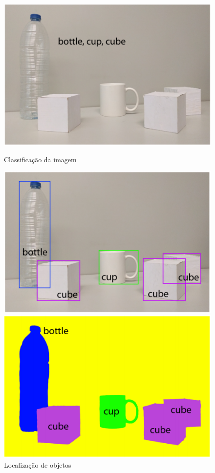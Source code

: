 \documentclass[12pt]{report}
\begin{document}
\begin{figure}
  \centering
  \begin{minipage}[b]{0.4\textwidth}
    \includegraphics[width=\textwidth]{images/seg1.png}
    \caption{Classificação da imagem}
  \end{minipage}
  \hfill
  \begin{minipage}[b]{0.4\textwidth}
    \includegraphics[width=\textwidth]{images/seg2.png}
    \caption{Localização de objetos}
  \end{minipage}
    \hfill
  \begin{minipage}[b]{0.4\textwidth}
    \includegraphics[width=\textwidth]{images/seg3.png}

\end{minipage}
\end{figure}
\end{document}
